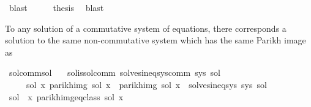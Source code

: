 \begin{isabellebody}
\ blast\isanewline
\ \ \isamarkupfalse%
\ \isamarkupfalse%
\ {\isacharquery}{\kern0pt}thesis\ \isamarkupfalse%
\ blast\isanewline
{}\isamarkupfalse%
%
\endisatagproof
{\isafoldproof}%
%
\isadelimproof
\isanewline
%
\endisadelimproof
\isanewline
{}\isamarkupfalse%
%
\isadelimdocument
%
\endisadelimdocument
%
\isatagdocument
%
\isamarkuptrue%
%
\endisatagdocument
{\isafolddocument}%
%
\isadelimdocument
%
\endisadelimdocument
%
\begin{isamarkuptext}%
To any solution  of a commutative system of equations, there corresponds
a solution to the same non-commutative system which has the same Parikh image as %
\end{isamarkuptext}\isamarkuptrue%
\isamarkupfalse%
\ sol{\isacharunderscore}{\kern0pt}comm{\isacharunderscore}{\kern0pt}sol{\isacharcolon}{\kern0pt}\isanewline
\ \ \ sol{\isacharunderscore}{\kern0pt}is{\isacharunderscore}{\kern0pt}sol{\isacharunderscore}{\kern0pt}comm{\isacharcolon}{\kern0pt}\ {\isachardoublequoteopen}solves{\isacharunderscore}{\kern0pt}ineq{\isacharunderscore}{\kern0pt}sys{\isacharunderscore}{\kern0pt}comm\ sys\ sol{\isachardoublequoteclose}\isanewline
\ \ \ \ \ {\isachardoublequoteopen}{\isasymexists}sol{\isacharprime}{\kern0pt}{\isachardot}{\kern0pt}\ {\isacharparenleft}{\kern0pt}{\isasymforall}x{\isachardot}{\kern0pt}\ parikh{\isacharunderscore}{\kern0pt}img\ {\isacharparenleft}{\kern0pt}sol\ x{\isacharparenright}{\kern0pt}\ {\isacharequal}{\kern0pt}\ parikh{\isacharunderscore}{\kern0pt}img\ {\isacharparenleft}{\kern0pt}sol{\isacharprime}{\kern0pt}\ x{\isacharparenright}{\kern0pt}{\isacharparenright}{\kern0pt}\ {\isasymand}\ solves{\isacharunderscore}{\kern0pt}ineq{\isacharunderscore}{\kern0pt}sys\ sys\ sol{\isacharprime}{\kern0pt}{\isachardoublequoteclose}\isanewline
%
\isadelimproof
%
\endisadelimproof
%
\isatagproof
{}\isamarkupfalse%
\isanewline
\ \ \isamarkupfalse%
\ {\isacharquery}{\kern0pt}sol{\isacharprime}{\kern0pt}\ {\isacharequal}{\kern0pt}\ {\isachardoublequoteopen}{\isasymlambda}x{\isachardot}{\kern0pt}\ {\isasymUnion}{\isacharparenleft}{\kern0pt}parikh{\isacharunderscore}{\kern0pt}img{\isacharunderscore}{\kern0pt}eq{\isacharunderscore}{\kern0pt}class\ {\isacharparenleft}{\kern0pt}sol\ x{\isacharparenright}{\kern0pt}{\isacharparenright}{\kern0pt}{\isachardoublequoteclose}\isanewline

\end{isabellebody}
